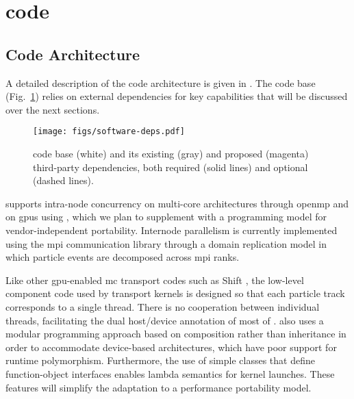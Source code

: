 \section{\celeritas code}

\subsection{Code Architecture}

A detailed description of the \celeritas code architecture is given in
\textcite{johnson_2021}. The code base (Fig.~\ref{fig:celeritas-code-base})
relies on external dependencies for key capabilities that will be discussed over
the next sections.
\begin{figure}
  \centering
  \texttt{[image: figs/software-deps.pdf]}
  \caption{\celeritas code base (white) and its existing (gray) and proposed
    (magenta) third-party dependencies, both required (solid lines) and optional
    (dashed lines).}
  \label{fig:celeritas-code-base}
\end{figure}

\celeritas supports intra-node concurrency on multi-core architectures through
\acs{openmp} and on \nvidia \acp{gpu} using \cuda, which we plan to supplement
with a programming model for vendor-independent portability.  Internode
parallelism is currently implemented using the \ac{mpi} communication library
through a domain replication model in which particle events are decomposed
across \ac{mpi} ranks.

Like other \ac{gpu}-enabled \ac{mc} transport codes such as Shift
\cite{pandya_implementation_2016,hamilton_multigroup_2018,
hamilton_continuous-energy_2019,hamilton_domain_2022}, the low-level component
code used by transport kernels is designed so that each particle track
corresponds to a single thread. There is no cooperation between individual
threads, facilitating the dual host/device annotation of most of \celeritas.
\celeritas also uses a modular programming approach based on composition rather
than inheritance in order to accommodate device-based architectures, which have
poor support for runtime polymorphism.  Furthermore, the use of simple classes
that define function-object interfaces enables lambda semantics for kernel
launches. These features will simplify the adaptation to a performance
portability model.

